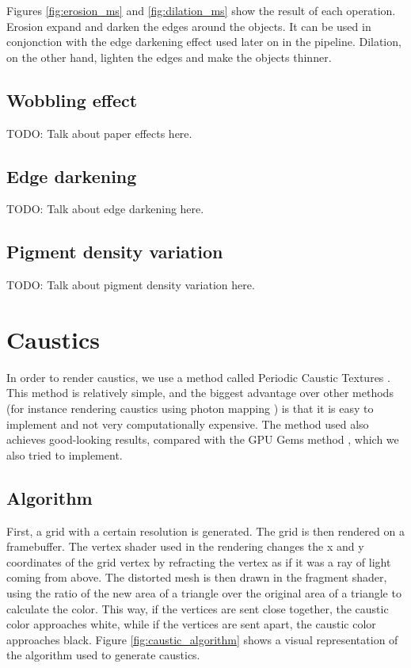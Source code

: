 \documentclass{article}
\begin{document}
\medskip \par
\noindent
Figures \ref{fig:erosion_ms} and \ref{fig:dilation_ms} show the result of each operation. 
Erosion expand and darken the edges around the objects. It can be used in conjonction with the edge darkening 
effect used later on in the pipeline. Dilation, on the other hand, 
lighten the edges and make the objects thinner.

\subsection{Wobbling effect}

TODO: Talk about paper effects here.

\subsection{Edge darkening}

TODO: Talk about edge darkening here.

\subsection{Pigment density variation}

TODO: Talk about pigment density variation here.

\newpage
\section{Caustics}
\label{sec:caustics}

In order to render caustics, we use a method called Periodic Caustic Textures \cite{periodic_caustic_textures}. 
This method is relatively simple, and the biggest advantage over other methods (for instance rendering caustics 
using photon mapping \cite{caustics_photon_mapping}) is that it is easy to implement and not very 
computationally expensive. The method used also achieves good-looking results, 
compared with the GPU Gems method \cite{caustics_gpu_gems}, which we also tried to implement.

\subsection{Algorithm}
First, a grid with a certain resolution is generated. The grid is then rendered on a framebuffer. 
The vertex shader used in the rendering changes the x and y coordinates of the grid vertex by refracting 
the vertex as if it was a ray of light coming from above. The distorted mesh is then drawn in the fragment 
shader, using the ratio of the new area of a triangle over the original area of a triangle to calculate the 
color. This way, if the vertices are sent close together, the caustic color approaches white, while if the 
vertices are sent apart, the caustic color approaches black.
Figure \ref{fig:caustic_algorithm} shows a visual representation of the algorithm used to generate caustics.
\end{document}
